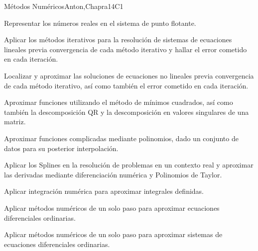 \begin{syllabus}
\begin{unit}{Métodos Numéricos}{}{Anton,Chapra}{14}{C1}
    \begin{learningoutcomes}
       \item Representar los números reales en el sistema de punto flotante.
       \item Aplicar los métodos iterativos para la resolución de sistemas de ecuaciones lineales previa convergencia de cada método iterativo y hallar el error cometido en cada iteración.
       \item Localizar y aproximar las soluciones de ecuaciones no lineales previa convergencia de cada método iterativo, así como también el error cometido en cada iteración.
       \item Aproximar funciones utilizando el método de mínimos cuadrados, así como también la descomposición QR y la descomposición en valores singulares de una matriz.
       \item Aproximar funciones complicadas mediante polinomios, dado un conjunto de datos para su posterior interpolación.
       \item Aplicar los Splines en la resolución de problemas en un contexto real y aproximar las derivadas mediante diferenciación numérica y Polinomios de Taylor.
       \item Aplicar integración numérica para aproximar integrales definidas.
       \item Aplicar métodos numéricos de un solo paso para aproximar ecuaciones diferenciales ordinarias.
       \item Aplicar métodos numéricos de un solo paso para aproximar sistemas de ecuaciones diferenciales ordinarias.
    \end{learningoutcomes}
 \end{unit}

\begin{coursebibliography}
\end{coursebibliography}

\end{syllabus}

%
